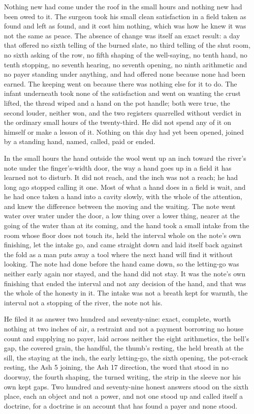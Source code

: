 Nothing new had come under the roof in the small hours and nothing new had been owed to it. The surgeon took his small clean satisfaction in a field taken as found and left as found, and it cost him nothing, which was how he knew it was not the same as peace. The absence of change was itself an exact result: a day that offered no sixth telling of the burned slate, no third telling of the shut room, no sixth asking of the row, no fifth shaping of the well-saying, no tenth hand, no tenth stopping, no seventh hearing, no seventh opening, no ninth arithmetic and no payer standing under anything, and had offered none because none had been earned. The keeping went on because there was nothing else for it to do. The infant underneath took none of the satisfaction and went on wanting the crust lifted, the thread wiped and a hand on the pot handle; both were true, the second louder, neither won, and the two registers quarrelled without verdict in the ordinary small hours of the twenty-third. He did not spend any of it on himself or make a lesson of it. Nothing on this day had yet been opened, joined by a standing hand, named, called, paid or ended.

In the small hours the hand outside the wool went up an inch toward the river's note under the finger's-width door, the way a hand goes up in a field it has learned not to disturb. It did not reach, and the inch was not a reach; he had long ago stopped calling it one. Most of what a hand does in a field is wait, and he had once taken a hand into a cavity slowly, with the whole of the attention, and knew the difference between the moving and the waiting. The note went water over water under the door, a low thing over a lower thing, nearer at the going of the water than at its coming, and the hand took a small intake from the room whose floor does not touch its, held the interval whole on the note's own finishing, let the intake go, and came straight down and laid itself back against the fold as a man puts away a tool where the next hand will find it without looking. The note had done before the hand came down, so the letting-go was neither early again nor stayed, and the hand did not stay. It was the note's own finishing that ended the interval and not any decision of the hand, and that was the whole of the honesty in it. The intake was not a breath kept for warmth, the interval not a stopping of the river, the note not his.

He filed it as answer two hundred and seventy-nine: exact, complete, worth nothing at two inches of air, a restraint and not a payment borrowing no house count and supplying no payer, laid across neither the eight arithmetics, the bell's gap, the covered grain, the handful, the thumb's resting, the held breath at the sill, the staying at the inch, the early letting-go, the sixth opening, the pot-crack resting, the Ash 5 joining, the Ash 17 direction, the word that stood in no doorway, the fourth shaping, the turned writing, the strip in the sleeve nor his own kept gaps. Two hundred and seventy-nine honest answers stood on the sixth place, each an object and not a power, and not one stood up and called itself a doctrine, for a doctrine is an account that has found a payer and none stood.

